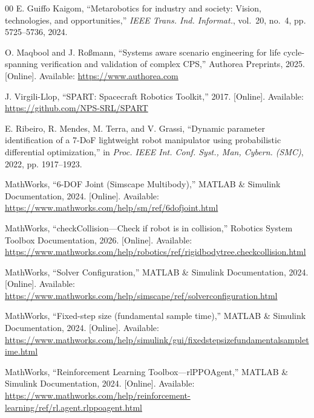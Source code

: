 \documentclass{ieeeaccess}
\begin{document}
\begin{thebibliography}{00}
E. Guiffo Kaigom, ``Metarobotics for industry and society: Vision, technologies, and opportunities,''
\emph{IEEE Trans. Ind. Informat.}, vol.~20, no.~4, pp. 5725--5736, 2024.



O. Maqbool and J. Roßmann, ``Systems aware scenario engineering for life cycle-spanning verification and
validation of complex CPS,'' Authorea Preprints, 2025. [Online]. Available: \url{https://www.authorea.com}



 J. Virgili-Llop, ``SPART: Spacecraft Robotics Toolkit,'' 2017. [Online]. Available:
\url{https://github.com/NPS-SRL/SPART}



 E. Ribeiro, R. Mendes, M. Terra, and V. Grassi, ``Dynamic parameter identification of a
7-DoF lightweight robot manipulator using probabilistic differential optimization,'' in \emph{Proc. IEEE
Int. Conf. Syst., Man, Cybern. (SMC)}, 2022, pp. 1917--1923.



 MathWorks, ``6-DOF Joint (Simscape Multibody),'' MATLAB \& Simulink Documentation,
2024. [Online]. Available: \url{https://www.mathworks.com/help/sm/ref/6dofjoint.html}



 MathWorks, ``checkCollision---Check if robot is in collision,'' Robotics System Toolbox
Documentation, 2026. [Online]. Available:
\url{https://www.mathworks.com/help/robotics/ref/rigidbodytree.checkcollision.html}



 MathWorks, ``Solver Configuration,'' MATLAB \& Simulink Documentation, 2024. [Online].
Available: \url{https://www.mathworks.com/help/simscape/ref/solverconfiguration.html}



 MathWorks, ``Fixed-step size (fundamental sample time),'' MATLAB \& Simulink Documentation,
2024. [Online]. Available:
\url{https://www.mathworks.com/help/simulink/gui/fixedstepsizefundamentalsampletime.html}



 MathWorks, ``Reinforcement Learning Toolbox---rlPPOAgent,'' MATLAB \& Simulink
Documentation, 2024. [Online]. Available:
\url{https://www.mathworks.com/help/reinforcement-learning/ref/rl.agent.rlppoagent.html}




\end{thebibliography}
\end{document}
